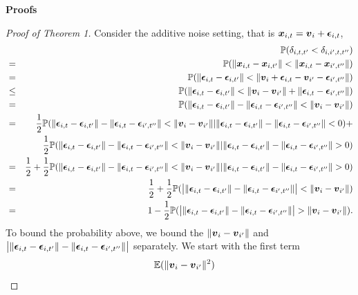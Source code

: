 \documentclass{article}
\begin{document}
\appendix
\noindent\bf{Proofs}
\begin{proof}[Proof of Theorem 1]
	Consider the additive noise setting, that is $\boldsymbol{x}_{i,t}=\boldsymbol{v}_{i} + \boldsymbol{\epsilon}_{i,t}$,  
	\begin{eqnarray*}
		& &\PP(\delta_{i,t,t'} < \delta_{i,i',t,t''}) \\
		&=&\PP(\|\bx_{i,t}-\bx_{i,t'}\|<\|\bx_{i,t}-\bx_{i',t''}\|) \\
		&=&\PP(\|\mb{\epsilon}_{i,t}-\mb{\epsilon}_{i,t'}\| < \|\bv_{i}+\mb{\epsilon}_{i,t}-\bv_{i'}-\mb{\epsilon}_{i',t''}\|) \\
		&\leq&\PP(\|\mb{\epsilon}_{i,t}-\mb{\epsilon}_{i,t'}\| < \|\bv_{i}-\bv_{i'}\| + \|\mb{\epsilon}_{i,t}-\mb{\epsilon}_{i',t''}\|) \\
		&=& \PP(\|\mb{\epsilon}_{i,t}-\mb{\epsilon}_{i,t'}\|-\|\mb{\epsilon}_{i,t}-\mb{\epsilon}_{i',t''}\|< \|\bv_{i}-\bv_{i'}\|) \\
		&=& \frac{1}{2}\PP(\|\mb{\epsilon}_{i,t}-\mb{\epsilon}_{i,t'}\|-\|\mb{\epsilon}_{i,t}-\mb{\epsilon}_{i',t''}\|< \|\bv_{i}-\bv_{i'}\||\|\mb{\epsilon}_{i,t}-\mb{\epsilon}_{i,t'}\|-\|\mb{\epsilon}_{i,t}-\mb{\epsilon}_{i',t''}\|<0) + \\ 
		& &\frac{1}{2}\PP(\|\mb{\epsilon}_{i,t}-\mb{\epsilon}_{i,t'}\|-\|\mb{\epsilon}_{i,t}-\mb{\epsilon}_{i',t''}\|< \|\bv_{i}-\bv_{i'}\||\|\mb{\epsilon}_{i,t}-\mb{\epsilon}_{i,t'}\|-\|\mb{\epsilon}_{i,t}-\mb{\epsilon}_{i',t''}\|>0) \\
		&=&\frac{1}{2} + \frac{1}{2}\PP(\|\mb{\epsilon}_{i,t}-\mb{\epsilon}_{i,t'}\|-\|\mb{\epsilon}_{i,t}-\mb{\epsilon}_{i',t''}\|< \|\bv_{i}-\bv_{i'}\||\|\mb{\epsilon}_{i,t}-\mb{\epsilon}_{i,t'}\|-\|\mb{\epsilon}_{i,t}-\mb{\epsilon}_{i',t''}\|>0) \\
		&=& \frac{1}{2} + \frac{1}{2}\PP(\big| \|\mb{\epsilon}_{i,t}-\mb{\epsilon}_{i,t'}\|-\|\mb{\epsilon}_{i,t}-\mb{\epsilon}_{i',t''}\| \big|< \|\bv_{i}-\bv_{i'}\|)\\
		&=& 1 - \frac{1}{2} \PP(\big| \|\mb{\epsilon}_{i,t}-\mb{\epsilon}_{i,t'}\|-\|\mb{\epsilon}_{i,t}-\mb{\epsilon}_{i',t''}\| \big|> \|\bv_{i}-\bv_{i'}\|).\\
	\end{eqnarray*}
	To bound the probability above, we bound the $\|\boldsymbol{v}_{i}-\boldsymbol{v}_{i'}\|$ and $\big| \|\boldsymbol{\epsilon}_{i,t}-\boldsymbol{\epsilon}_{i,t'}\|-\|\boldsymbol{\epsilon}_{i,t}-\boldsymbol{\epsilon}_{i',t''}\| \big|$ separately. We start with the first term
	\begin{eqnarray*}
		& &\EE(\|\bv_{i}-\bv_{i'}\|^2) \\

\end{eqnarray*}
\end{proof}
\end{document}

